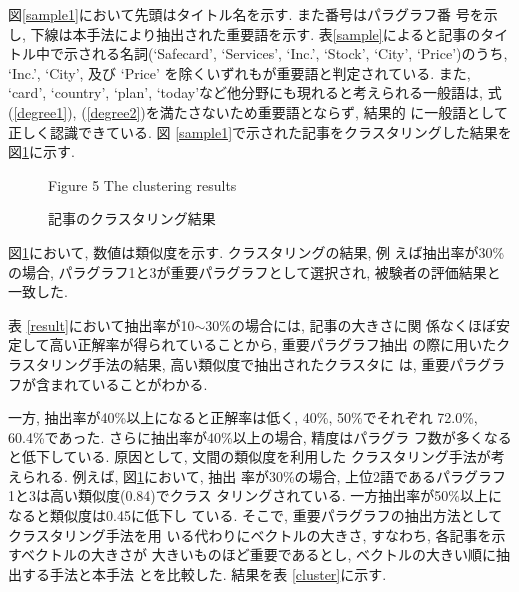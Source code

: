 \noindent
図\ref{sample1}において先頭はタイトル名を示す.  また番号はパラグラフ番
号を示し, 下線は本手法により抽出された重要語を示す.  表\ref{sample}によると記事のタイトル中で示される名詞(`Safecard',
`Services', `Inc.', `Stock', `City', `Price')のうち, `Inc.', `City', 
及び `Price' を除くいずれもが重要語と判定されている.  また, `card',
`country', `plan', `today'など他分野にも現れると考えられる一般語は, 式
(\ref{degree1}), (\ref{degree2})を満たさないため重要語とならず, 結果的
に一般語として正しく認識できている.  図 \ref{sample1}で示された記事をクラスタリングした結果を図\ref{sample2}に示す.


{
\begin{figure}[htbp]
\centerline{
}
\caption{記事のクラスタリング結果} \label{sample2}
\begin{center}
\vspace*{-5mm}
Figure 5 The clustering results 
\end{center}
\end{figure}
}

\noindent
図\ref{sample2}において, 数値は類似度を示す.  クラスタリングの結果, 例
えば抽出率が30\%の場合, パラグラフ1と3が重要パラグラフとして選択され, 
被験者の評価結果と一致した.


表 \ref{result}において抽出率が10$\sim$30\%の場合には, 記事の大きさに関
係なくほぼ安定して高い正解率が得られていることから, 重要パラグラフ抽出
の際に用いたクラスタリング手法の結果, 高い類似度で抽出されたクラスタに
は, 重要パラグラフが含まれていることがわかる.

一方, 抽出率が40\%以上になると正解率は低く, 40\%, 50\%でそれぞれ
72.0\%, 60.4\%であった.  さらに抽出率が40\%以上の場合, 精度はパラグラ
フ数が多くなると低下している.  原因として, 文間の類似度を利用した
クラスタリング手法が考えられる.  例えば, 図\ref{sample2}において, 抽出
率が30\%の場合, 上位2語であるパラグラフ1と3は高い類似度(0.84)でクラス
タリングされている.  一方抽出率が50\%以上になると類似度は0.45に低下し
ている.  そこで, 重要パラグラフの抽出方法としてクラスタリング手法を用
いる代わりにベクトルの大きさ, すなわち, 各記事を示すベクトルの大きさが
大きいものほど重要であるとし, ベクトルの大きい順に抽出する手法と本手法
とを比較した.  結果を表
\ref{cluster}に示す.



